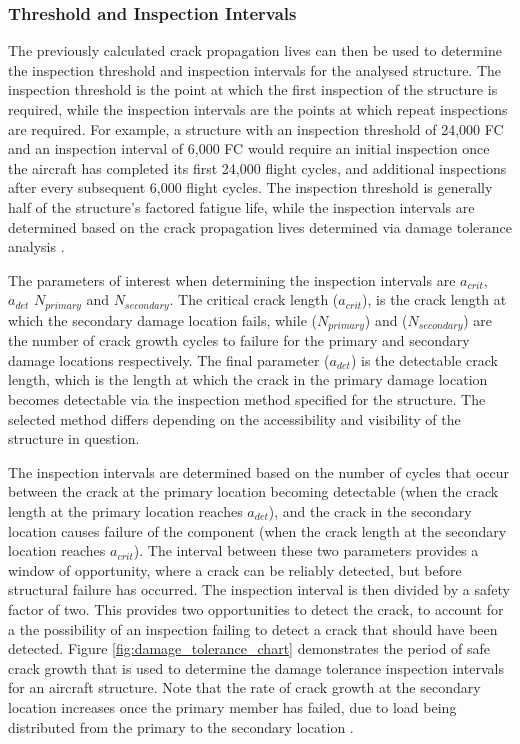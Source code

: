 \subsubsection*{Threshold and Inspection Intervals}

The previously calculated crack propagation lives can then be used to determine the inspection threshold and inspection intervals for the analysed structure. The inspection threshold is the point at which the first inspection of the structure is required, while the inspection intervals are the points at which repeat inspections are required. For example, a structure with an inspection threshold of 24,000 FC and an inspection interval of 6,000 FC would require an initial inspection once the aircraft has completed its first 24,000 flight cycles, and additional inspections after every subsequent 6,000 flight cycles. The inspection threshold is generally half of the structure's factored fatigue life, while the inspection intervals are determined based on the crack propagation lives determined via damage tolerance analysis \cite{gallagher_damage_2005}.

The parameters of interest when determining the inspection intervals are $a_{crit}$, $a_{det}$ $N_{primary}$ and $N_{secondary}$. The critical crack length ($a_{crit}$), is the crack length at which the secondary damage location fails, while ($N_{primary}$) and ($N_{secondary}$) are the number of crack growth cycles to failure for the primary and secondary damage locations respectively. The final parameter ($a_{det}$) is the detectable crack length, which is the length at which the crack in the primary damage location becomes detectable via the inspection method specified for the structure. The selected method differs depending on the accessibility and visibility of the structure in question.

The inspection intervals are determined based on the number of cycles that occur between the crack at the primary location becoming detectable (when the crack length at the primary location reaches $a_{det}$), and the crack in the secondary location causes failure of the component (when the crack length at the secondary location reaches $a_{crit}$). The interval between these two parameters provides a window of opportunity, where a crack can be reliably detected, but before structural failure has occurred. The inspection interval is then divided by a safety factor of two. This provides two opportunities to detect the crack, to account for a the possibility of an inspection failing to detect a crack that should have been detected. Figure \ref{fig:damage_tolerance_chart} demonstrates the period of safe crack growth that is used to determine the damage tolerance inspection intervals for an aircraft structure. Note that the rate of crack growth at the secondary location increases once the primary member has failed, due to load being distributed from the primary to the secondary location \cite{tomblin_review_1999}.


